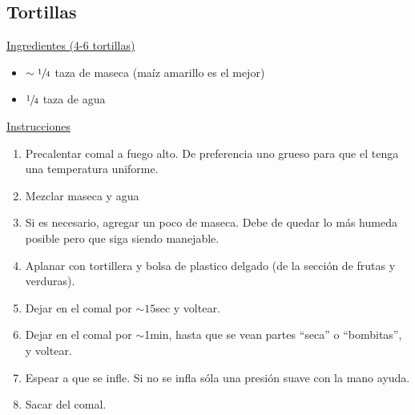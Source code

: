 \subsection{Tortillas}

\underline{Ingredientes (4-6 tortillas)}
\begin{itemize}
\item $\sim\sfrac{1}{4}$ taza de maseca (maíz amarillo es el mejor)
\item $\sfrac{1}{4}$ taza de agua
\end{itemize}

\underline{Instrucciones}
\begin{enumerate}
\item Precalentar comal a fuego alto. De preferencia uno grueso para que el tenga una temperatura uniforme.
\item Mezclar maseca y agua
\item Si es necesario, agregar un poco de maseca. Debe de quedar lo más humeda posible pero que siga siendo manejable.
\item Aplanar con tortillera y bolsa de plastico delgado (de la sección de frutas y verduras).
\item Dejar en el comal por $\sim15$sec y voltear.
\item Dejar en el comal por $\sim$1min, hasta que se vean partes ``seca'' o ``bombitas'', y voltear.
\item Espear a que se infle. Si no se infla sóla una presión suave con la mano ayuda.
\item Sacar del comal.
\end{enumerate}

